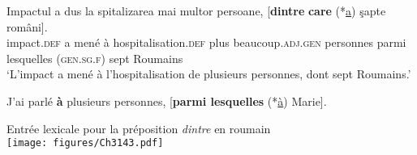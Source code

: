 \ea \label{ch3:ex141}
\gll Impactul  a  dus  la  spitalizarea  mai  multor  persoane, [\textbf{dintre} \textbf{care}  (*\uline{a})  şapte  români].\\
impact.\textsc{def}  a  mené  à  hospitalisation.\textsc{def}  plus  beaucoup.\textsc{adj.gen}  personnes parmi  lesquelles  (\textsc{gen.sg.f)}  sept  Roumains\\
\glt ‘L’impact a mené à l’hospitalisation de plusieurs personnes, dont sept Roumains.’
\z 

\ea \label{ch3:ex142}
J’ai parlé \textbf{à} plusieurs personnes, [\textbf{parmi lesquelles} (*\uline{à}) Marie].
\z

\ea \label{ch3:ex143}
Entrée lexicale pour la préposition \textit{dintre} en roumain\\
\texttt{[image: figures/Ch3143.pdf]}


\z


